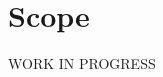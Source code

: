 \documentclass[../../DD.tex]{subfiles}
\begin{document}
\section{Scope}
	WORK IN PROGRESS
	
\end{document}
